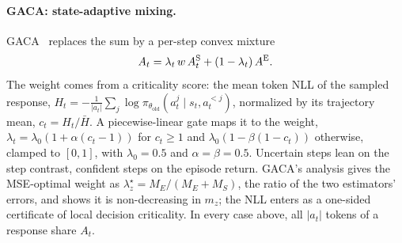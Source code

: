\paragraph{GACA: state-adaptive mixing.}
GACA~\cite{liang2026gaca} replaces the sum by a per-step convex mixture
\begin{equation}
A_t = \lambda_t\, w\, A^{\mathrm{S}}_t + (1 - \lambda_t)\, A^{\mathrm{E}}.
\label{eq:gaca}
\end{equation}
The weight comes from a criticality score: the mean token NLL of the sampled response,
$H_t = -\frac{1}{|a_t|}\sum_j \log \pi_{\theta_{\mathrm{old}}}(a_t^j \mid s_t, a_t^{<j})$, normalized by its
trajectory mean, $c_t = H_t / \bar H$. A piecewise-linear gate maps it to the weight,
$\lambda_t = \lambda_0(1 + \alpha(c_t - 1))$ for $c_t \geq 1$ and $\lambda_0(1 - \beta(1 - c_t))$
otherwise, clamped to $[0, 1]$, with $\lambda_0 = 0.5$ and $\alpha = \beta = 0.5$. Uncertain steps
lean on the step contrast, confident steps on the episode return. GACA's analysis gives the
MSE-optimal weight as $\lambda^\star_z = M_E/(M_E + M_S)$, the ratio of the two estimators' errors, and
shows it is non-decreasing in $m_z$; the NLL enters as a one-sided certificate of local decision
criticality. In every case above, all $|a_t|$ tokens of a response share $A_t$.
